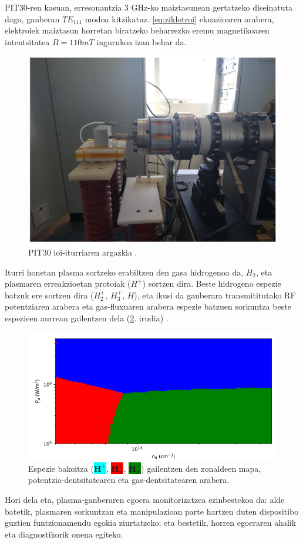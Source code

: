 \documentclass[12pt]{article}
\numberwithin{figure}{section}
\numberwithin{equation}{section}
\begin{document}
\newpage
PIT30-ren kasuan, erresonantzia 3 GHz-ko maiztasunean gertatzeko diseinatuta dago, ganberan $TE_{111}$ modoa kitzikatuz. \eqref{eq:ziklotroi} ekuazioaren arabera, elektroiek maiztasun horretan biratzeko beharrezko eremu magnetikoaren intentsitatea $B=110mT$ ingurukoa izan behar da.

\begin{figure}[h]
    \centering
    \includegraphics[width=0.5\linewidth]{1 - Sarrera/pit30argazkia.png}
    \caption{PIT30 ioi-iturriaren argazkia \cite{feuchtwanger_new_2022}.}
    \label{fig:pit30iturria}
\end{figure}

Iturri honetan plasma sortzeko erabiltzen den gasa hidrogenoa da, $H_2$, eta plasmaren erreakzioetan protoiak ($H^+$) sortzen dira. Beste hidrogeno espezie batzuk ere sortzen dira ($H_2^+$, $H_3^+$, $H$), eta ikusi da ganberara transmititutako RF potentziaren arabera eta gas-fluxuaren arabera espezie batzuen sorkuntza beste espezieen aurrean gailentzen dela (\ref{fig:mapa}. irudia) \cite{elorza_romera_modelo_2022}.

\begin{figure}[h]
    \centering
    \includegraphics[width=0.8\linewidth]{1 - Sarrera/predominant_map.PNG}
    \caption{Espezie bakoitza (\colorbox{cyan}{$\mathbf{H_{ }^+}$}, \colorbox{red}{$\mathbf{H_2^+}$}, \colorbox{green}{$\mathbf{H_3^+}$}) gailentzen den zonaldeen mapa, potentzia-dentsitatearen eta gas-dentsitatearen arabera.}
    \label{fig:mapa}
\end{figure}
Hori dela eta, plasma-ganberaren egoera monitorizatzea ezinbestekoa da: alde batetik, plasmaren sorkuntzan eta manipulazioan parte hartzen duten dispositibo guztien funtzionamendu egokia ziurtatzeko; eta bestetik, horren egoeraren ahalik eta diagnostikorik onena egiteko.
\end{document}

